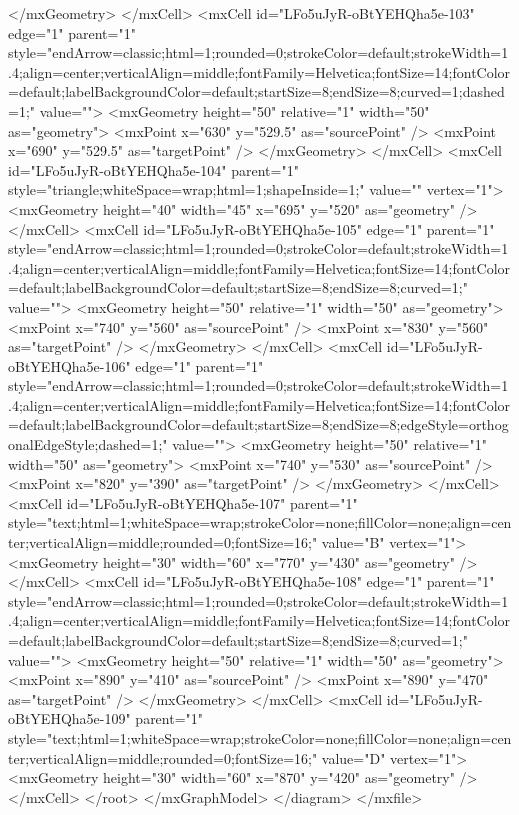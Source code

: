           </mxGeometry>
        </mxCell>
        <mxCell id="LFo5uJyR-oBtYEHQha5e-103" edge="1" parent="1" style="endArrow=classic;html=1;rounded=0;strokeColor=default;strokeWidth=1.4;align=center;verticalAlign=middle;fontFamily=Helvetica;fontSize=14;fontColor=default;labelBackgroundColor=default;startSize=8;endSize=8;curved=1;dashed=1;" value="">
          <mxGeometry height="50" relative="1" width="50" as="geometry">
            <mxPoint x="630" y="529.5" as="sourcePoint" />
            <mxPoint x="690" y="529.5" as="targetPoint" />
          </mxGeometry>
        </mxCell>
        <mxCell id="LFo5uJyR-oBtYEHQha5e-104" parent="1" style="triangle;whiteSpace=wrap;html=1;shapeInside=1;" value="" vertex="1">
          <mxGeometry height="40" width="45" x="695" y="520" as="geometry" />
        </mxCell>
        <mxCell id="LFo5uJyR-oBtYEHQha5e-105" edge="1" parent="1" style="endArrow=classic;html=1;rounded=0;strokeColor=default;strokeWidth=1.4;align=center;verticalAlign=middle;fontFamily=Helvetica;fontSize=14;fontColor=default;labelBackgroundColor=default;startSize=8;endSize=8;curved=1;" value="">
          <mxGeometry height="50" relative="1" width="50" as="geometry">
            <mxPoint x="740" y="560" as="sourcePoint" />
            <mxPoint x="830" y="560" as="targetPoint" />
          </mxGeometry>
        </mxCell>
        <mxCell id="LFo5uJyR-oBtYEHQha5e-106" edge="1" parent="1" style="endArrow=classic;html=1;rounded=0;strokeColor=default;strokeWidth=1.4;align=center;verticalAlign=middle;fontFamily=Helvetica;fontSize=14;fontColor=default;labelBackgroundColor=default;startSize=8;endSize=8;edgeStyle=orthogonalEdgeStyle;dashed=1;" value="">
          <mxGeometry height="50" relative="1" width="50" as="geometry">
            <mxPoint x="740" y="530" as="sourcePoint" />
            <mxPoint x="820" y="390" as="targetPoint" />
          </mxGeometry>
        </mxCell>
        <mxCell id="LFo5uJyR-oBtYEHQha5e-107" parent="1" style="text;html=1;whiteSpace=wrap;strokeColor=none;fillColor=none;align=center;verticalAlign=middle;rounded=0;fontSize=16;" value="B" vertex="1">
          <mxGeometry height="30" width="60" x="770" y="430" as="geometry" />
        </mxCell>
        <mxCell id="LFo5uJyR-oBtYEHQha5e-108" edge="1" parent="1" style="endArrow=classic;html=1;rounded=0;strokeColor=default;strokeWidth=1.4;align=center;verticalAlign=middle;fontFamily=Helvetica;fontSize=14;fontColor=default;labelBackgroundColor=default;startSize=8;endSize=8;curved=1;" value="">
          <mxGeometry height="50" relative="1" width="50" as="geometry">
            <mxPoint x="890" y="410" as="sourcePoint" />
            <mxPoint x="890" y="470" as="targetPoint" />
          </mxGeometry>
        </mxCell>
        <mxCell id="LFo5uJyR-oBtYEHQha5e-109" parent="1" style="text;html=1;whiteSpace=wrap;strokeColor=none;fillColor=none;align=center;verticalAlign=middle;rounded=0;fontSize=16;" value="D" vertex="1">
          <mxGeometry height="30" width="60" x="870" y="420" as="geometry" />
        </mxCell>
      </root>
    </mxGraphModel>
  </diagram>
</mxfile>
